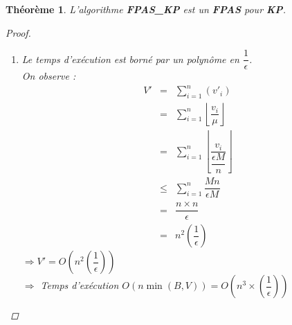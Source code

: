 \documentclass{article}
\newcommand{\titre}[1]{\textcolor{title}{#1}}
\newcommand{\cdil}[1]{\left\lfloor #1 \right\rfloor}
\newtheorem{thm}{Th\'eor\`eme}[section]
\newtheorem{proof}{Preuve}[section]
\begin{document}
\begin{sffamily}
\begin{thm}
L'algorithme \textbf{FPAS\_KP} est un \textbf{FPAS} pour \textbf{\titre{KP}}.
\begin{proof}$ $
\begin{enumerate}
\item[a)] Le temps d'exécution est borné par un polynôme en $\dfrac{1}{\epsilon}$. \\
On observe :
\begin{eqnarray}
\nonumber V' & = & \sum_{i=1}^n(v'_i) \\
\nonumber    & = & \sum_{i=1}^n\cdil{\dfrac{v_i}{\mu}} \\
\nonumber    & = & \sum_{i=1}^n \cdil{\dfrac{v_i}{\dfrac{\epsilon M}{n}}} \\
\nonumber    & \leq & \sum_{i=1}^n \dfrac{Mn}{\epsilon M} \\
\nonumber    & = & \dfrac{n\times n}{\epsilon} \\
\nonumber    & = & n^2\left(\dfrac{1}{\epsilon}\right)
\end{eqnarray}
$\Rightarrow V'= O\left(n^2\left(\dfrac{1}{\epsilon}\right)\right)$\\
$\Longrightarrow$ Temps d'exécution $O(n\min(B,V)) = O\left(n^3\times \left(\dfrac{1}{\epsilon}\right)\right)$


\end{enumerate}
\end{proof}
\end{thm}
\end{sffamily}
\end{document}
